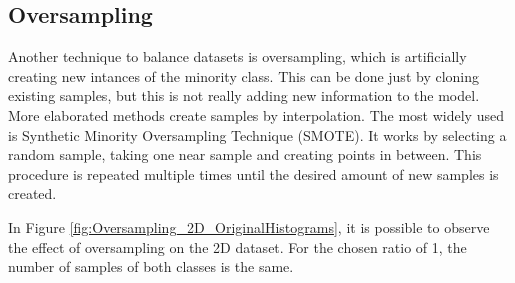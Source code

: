 \documentclass[conference]{IEEEtran}
\begin{document}
	\subsection{Oversampling}
	
	Another technique to balance datasets is oversampling, which is artificially creating new intances of the minority class. This can be done just by cloning existing samples, but this is not really adding new information to the model. More elaborated methods create samples by interpolation. The most widely used is Synthetic Minority Oversampling Technique (SMOTE). It works by selecting a random sample, taking one near sample and creating points in between. This procedure is repeated multiple times until the desired amount of new samples is created. 
	
	In Figure \ref{fig:Oversampling_2D_OriginalHistograms}, it is possible to observe the effect of oversampling on the 2D dataset. For the chosen ratio of 1, the number of samples of both classes is the same. 
	
\end{document}
